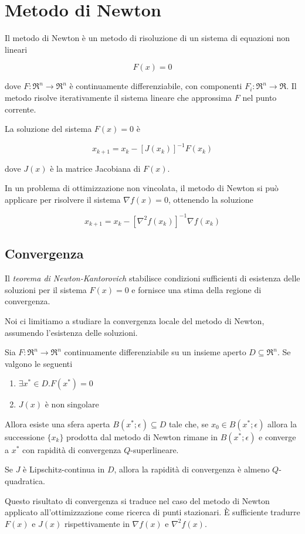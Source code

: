 \chapter{Metodo di Newton}
\label{chp:methods.newton}
Il metodo di Newton è un metodo di risoluzione di un sistema di equazioni non lineari

$$F(x)=0$$

dove $F:\Re^{n}\rightarrow\Re^{n}$ è continuamente differenziabile, con componenti $F_{i}:\Re^{n}\rightarrow\Re$.
Il metodo risolve iterativamente il sistema lineare che approssima $F$ nel punto corrente.

La soluzione del sistema $F(x)=0$ è

\begin{equation}
  \label{eqn:methods.newton.solution}
  x_{k+1}=x_{k}-[J(x_{k})]^{-1}F(x_{k})
\end{equation}

dove $J(x)$ è la matrice Jacobiana di $F(x)$.

In un problema di ottimizzazione non vincolata, il metodo di Newton si può applicare per risolvere il sistema $\nabla f(x)=0$, ottenendo la soluzione

\begin{equation}
  \label{eqn:methods.newton.solution2}
  x_{k+1}=x_{k}-[\nabla^{2}f(x_{k})]^{-1}\nabla f(x_{k})
\end{equation}


\section{Convergenza}
\label{sec:methods.newton.convergence}
Il \textit{teorema di Newton-Kantorovich} stabilisce condizioni sufficienti di esistenza delle soluzioni per il sistema $F(x)=0$ e fornisce una stima della regione di convergenza.

Noi ci limitiamo a studiare la convergenza locale del metodo di Newton, assumendo l'esistenza delle soluzioni.

\begin{theorem}
  \label{thm:methods.newton.convergence}
  Sia $F:\Re^{n}\rightarrow\Re^{n}$ continuamente differenziabile su un insieme aperto $D\subseteq\Re^{n}$.
  Se valgono le seguenti
  \begin{enumerate}
    \item $\exists x^{*}\in D.F(x^{*})=0$
    \item $J(x)$ è non singolare
  \end{enumerate}
  Allora esiste una sfera aperta $B(x^{*};\epsilon)\subseteq D$ tale che, se $x_{0}\in B(x^{*};\epsilon)$ allora la successione $\{x_{k}\}$ prodotta dal metodo di Newton rimane in $B(x^{*};\epsilon)$ e converge a $x^{*}$ con rapidità di convergenza $Q$-superlineare.

  Se $J$ è Lipschitz-continua in $D$, allora la rapidità di convergenza è almeno $Q$-quadratica.
\end{theorem}

Questo risultato di convergenza si traduce nel caso del metodo di Newton applicato all'ottimizzazione come ricerca di punti stazionari. È sufficiente tradurre $F(x)$ e $J(x)$ rispettivamente in $\nabla f(x)$ e $\nabla^{2}f(x)$.
